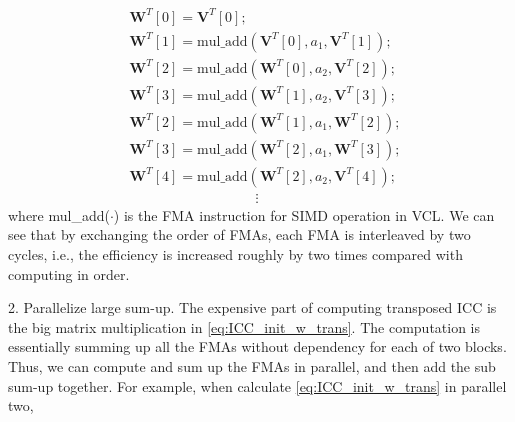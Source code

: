 \begin{equation}
    \label{eq:interleave_dependency}
    \begin{aligned}
        & \bm{W}^T[0] = \bm{V}^T[0]; \\
        & \bm{W}^T[1] = \text{mul\_add}(\bm{V}^T[0],a_1,\bm{V}^T[1]); \\
        & \bm{W}^T[2] = \text{mul\_add}(\bm{W}^T[0],a_2,\bm{V}^T[2]); \\
        & \bm{W}^T[3] = \text{mul\_add}(\bm{W}^T[1],a_2,\bm{V}^T[3]); \\
        & \bm{W}^T[2] = \text{mul\_add}(\bm{W}^T[1],a_1,\bm{W}^T[2]); \\
        & \bm{W}^T[3] = \text{mul\_add}(\bm{W}^T[2],a_1,\bm{W}^T[3]); \\
        & \bm{W}^T[4] = \text{mul\_add}(\bm{W}^T[2],a_2,\bm{V}^T[4]); \\
        & \quad\quad\quad\quad\quad\quad\quad\quad\quad \vdots
    \end{aligned}
\end{equation}
where mul\_add($\cdot$) is the FMA instruction for SIMD operation in VCL.
We can see that by exchanging the order of FMAs, each FMA is interleaved by two cycles, i.e.,
the efficiency is increased roughly by two times compared with computing in order. 

2. Parallelize large sum-up. The expensive part of computing transposed ICC is the big matrix multiplication in \eqref{eq:ICC_init_w_trans}.
The computation is essentially summing up all the FMAs without dependency for each of two blocks. Thus, we can compute and sum up the FMAs in parallel, and then
add the sub sum-up together. For example, when calculate \eqref{eq:ICC_init_w_trans} in parallel two,

